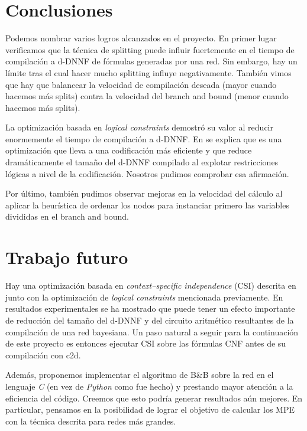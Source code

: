 \documentclass[11pt, letterpaper]{article}
\begin{document}
\section{Conclusiones}

Podemos nombrar varios logros alcanzados en el proyecto. En primer lugar
verificamos que la técnica de splitting puede influir fuertemente en el tiempo
de compilación a d-DNNF de fórmulas generadas por una red. Sin embargo,
hay un límite tras el cual hacer mucho splitting influye negativamente.
También vimos que hay
que balancear la velocidad de compilación deseada (mayor cuando hacemos más
splits) contra la velocidad del branch and bound (menor cuando hacemos más
splits).

La optimización basada en \emph{logical constraints} demostró su valor al
reducir enormemente el tiempo de compilación a d-DNNF. En
\cite{Darwiche01alogical} se explica que es una optimización que lleva a una
codificación más eficiente y que reduce dramáticamente el tamaño del d-DNNF
compilado al explotar restricciones lógicas a nivel de la codificación.
Nosotros pudimos comprobar esa
afirmación.

Por último, también pudimos observar mejoras en la velocidad del cálculo al
aplicar la heurística de ordenar los nodos para instanciar primero las variables
divididas en el branch and bound.

\section{Trabajo futuro}

Hay una optimización basada en \emph{context–specific independence} (CSI)
descrita en
\cite{Darwiche01alogical} junto con la optimización de \emph{logical constraints}
mencionada previamente. En resultados experimentales se ha mostrado que puede
tener un efecto importante de reducción del tamaño del d-DNNF y del circuito
aritmético resultantes de la compilación de una red bayesiana. Un paso natural a
seguir para la continuación de este proyecto es entonces ejecutar CSI sobre las
fórmulas CNF antes de su compilación con c2d.

Además, proponemos implementar el algoritmo de B\&B sobre la red en el
lenguaje \emph{C} (en vez de \emph{Python} como fue hecho) y prestando mayor
atención a la eficiencia del código. Creemos
que esto podría generar resultados aún mejores. En particular, pensamos en la
posibilidad de lograr el objetivo de calcular los MPE con la técnica descrita
para redes más grandes.



\end{document}
